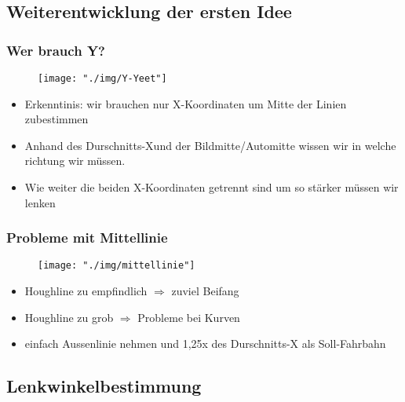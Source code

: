 \documentclass{beamer}
\begin{document}
	\subsection{Weiterentwicklung der ersten Idee}

	\begin{frame}
		\frametitle{Wer brauch Y?}
		\begin{center}
			\begin{figure}[h]
				\texttt{[image: "./img/Y-Yeet"]}
				\label{fig:Weg mit dem Y}
			\end{figure}
		\end{center}

		\begin{itemize}
			\item Erkenntinis: wir brauchen nur X-Koordinaten um Mitte der Linien 		zubestimmen
			\item Anhand des \glqq Durschnitts-X\grqq  und der Bildmitte/Automitte wissen wir in welche richtung wir müssen. 
			\item Wie weiter die beiden X-Koordinaten getrennt sind um so stärker müssen wir lenken 
		\end{itemize}
	\end{frame}

	\begin{frame}
		\frametitle{Probleme mit Mittellinie}
		\begin{center}
			\begin{figure}[h]
				\texttt{[image: "./img/mittellinie"]}
				\label{fig:Mittellinie}
			\end{figure}
		\end{center}
		
		\begin{itemize}
			\item Houghline zu empfindlich $\Rightarrow$ zuviel \glqq Beifang\grqq 
			\item Houghline zu grob $\Rightarrow$ Probleme bei Kurven
			\item einfach Aussenlinie nehmen und 1,25x des Durschnitts-X als Soll-Fahrbahn
		\end{itemize}
	\end{frame}


	\subsection{Lenkwinkelbestimmung}
	
\end{document}
